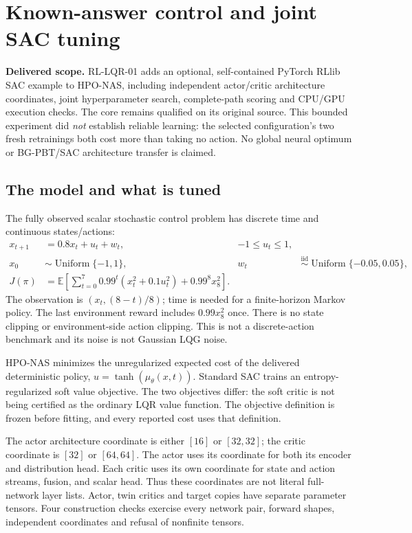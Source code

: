 \chapter{Known-answer control and joint SAC tuning}
\label{sec:rl-lqr}

\begin{decisions}
\textbf{Delivered scope.} RL-LQR-01 adds an optional, self-contained PyTorch
RLlib SAC example to HPO-NAS, including independent actor/critic architecture
coordinates, joint hyperparameter search, complete-path scoring and CPU/GPU
execution checks. The core remains qualified on its original source. This
bounded experiment did \emph{not} establish reliable learning: the selected
configuration's two fresh retrainings both cost more than taking no action.
No global neural optimum or BG-PBT/SAC architecture transfer is claimed.
\end{decisions}

\section{The model and what is tuned}
The fully observed scalar stochastic control problem has discrete time and
continuous states/actions:
\begin{align}
 x_{t+1}&=0.8x_t+u_t+w_t, & -1\leq u_t\leq1,\\
 x_0&\sim\operatorname{Uniform}\{-1,1\}, &
 w_t&\overset{\mathrm{iid}}{\sim}\operatorname{Uniform}\{-0.05,0.05\},\\
 J(\pi)&=\mathbb{E}\left[\sum_{t=0}^{7}0.99^t(x_t^2+0.1u_t^2)
                  +0.99^8x_8^2\right].
\end{align}
The observation is $(x_t,(8-t)/8)$; time is needed for a finite-horizon Markov
policy. The last environment reward includes $0.99x_8^2$ once. There is no
state clipping or environment-side action clipping. This is not a
discrete-action benchmark and its noise is not Gaussian LQG noise.

HPO-NAS minimizes the unregularized expected cost of the delivered deterministic
policy, $u=\tanh(\mu_\theta(x,t))$. Standard SAC trains an entropy-regularized
soft value objective. The two objectives differ: the soft critic is not being
certified as the ordinary LQR value function. The objective definition is
frozen before fitting, and every reported cost uses that definition.

The actor architecture coordinate is either $[16]$ or $[32,32]$; the critic
coordinate is $[32]$ or $[64,64]$. The actor uses its coordinate for both its
encoder and distribution head. Each critic uses its own coordinate for state
and action streams, fusion, and scalar head. Thus these coordinates are not
literal full-network layer lists. Actor, twin critics and target copies have
separate parameter tensors. Four construction checks exercise every network
pair, forward shapes, independent coordinates and refusal of nonfinite tensors.

